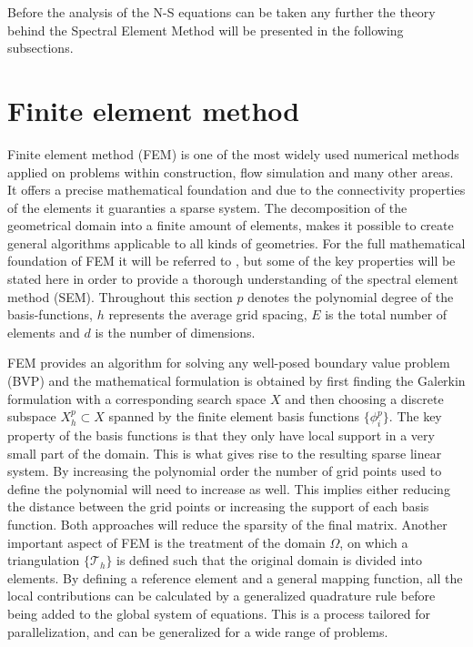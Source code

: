 Before the analysis of the N-S equations can be taken any further the theory behind the Spectral Element Method will be presented in the following
subsections.


\section{Finite element method}

Finite element method (FEM) is one of the most widely used numerical methods applied on problems within construction, flow simulation and many 
other areas. It offers a precise mathematical foundation and due to the connectivity properties of the elements 
it guaranties a sparse system. The decomposition of the geometrical domain into a finite amount of elements,
makes it possible to create general algorithms applicable to all kinds of geometries. 
For the full mathematical foundation of FEM it will be referred to \cite{Quarteroni}, but some of the key properties will be stated here
in order to provide a thorough understanding of the spectral element method (SEM). 
Throughout this section $p$ denotes the polynomial degree of the basis-functions, $h$ represents the average grid spacing, $E$ is the total
number of elements and $d$ is the number of dimensions. 

FEM provides an algorithm for solving any well-posed boundary value problem (BVP) and the mathematical 
formulation is obtained by first finding the Galerkin
formulation with a corresponding search space $X$ and then choosing a discrete subspace $X^p_h\subset X$ 
spanned by the finite element basis functions $\{\phi^p_i\}$.
The key property of the basis functions is that they only have local support in a very small part of the domain. 
This is what gives rise to the resulting sparse linear system. 
By increasing the polynomial order the number of grid points used to define the polynomial will need to increase as well.
This implies either reducing the distance between the grid points or increasing the support of each basis function.
Both approaches will reduce the sparsity of the final matrix.
Another important aspect of FEM is the treatment of the domain $\Omega$, 
on which a triangulation $\{\mathcal{T}_h\}$ is defined such that the original domain is divided into elements.
By defining a reference element and a general mapping function, all the local contributions can be calculated by a 
generalized quadrature rule before being added to the global system of equations. This is a process tailored for parallelization, and can 
be generalized for a wide range of problems.

